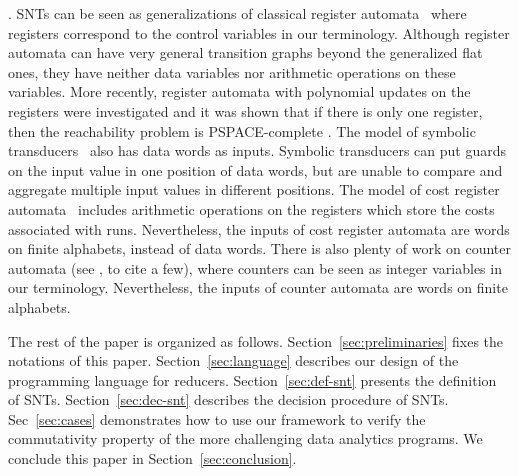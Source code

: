 \smallskip

.
SNTs can be seen as generalizations of classical register automata~\cite{KF94,NSV04} where registers correspond to the control variables in our terminology. Although register automata can have very general transition graphs beyond the generalized flat ones, they have neither data variables nor arithmetic operations on these variables. More recently,  register automata with polynomial updates on the registers were investigated and it was shown that if there is only one register, then the reachability problem is PSPACE-complete \cite{FGH13}.
%
%
The model of symbolic transducers~\cite{VHL+12} also has data words as inputs. Symbolic transducers can put guards on the input value in one position of data words, but are unable to compare and aggregate multiple input values in different positions. The model of cost register automata~\cite{ADD+13} includes arithmetic operations on the registers which store the costs associated with runs. Nevertheless, the inputs of cost register automata are words on finite alphabets, instead of data words. There is also plenty of work on counter automata (see \cite{Iba78,CJ98,LS06}, to cite a few), where counters can be seen as integer variables in our terminology. Nevertheless, the inputs of counter automata are words on finite alphabets.

The rest of the paper is organized as follows. Section~\ref{sec:preliminaries} fixes the notations of this paper. Section~\ref{sec:language} describes our design of the programming language for reducers. Section~\ref{sec:def-snt} presents the definition of SNTs. Section~\ref{sec:dec-snt} describes the decision procedure of SNTs. Sec~\ref{sec:cases} demonstrates how to use our framework to verify the commutativity property of the more challenging data analytics programs. We conclude this paper in Section~\ref{sec:conclusion}. 